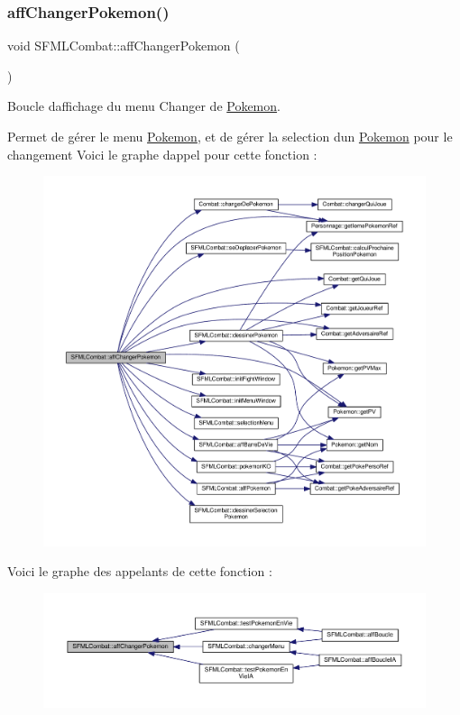 \subsubsection{\texorpdfstring{aff\+Changer\+Pokemon()}{affChangerPokemon()}}
{\footnotesize\ttfamily void S\+F\+M\+L\+Combat\+::aff\+Changer\+Pokemon (\begin{DoxyParamCaption}{ }\end{DoxyParamCaption})\hspace{0.3cm}{\ttfamily [private]}}



Boucle d\textquotesingle{}affichage du menu Changer de \hyperlink{class_pokemon}{Pokemon}. 

Permet de gérer le menu \hyperlink{class_pokemon}{Pokemon}, et de gérer la selection d\textquotesingle{}un \hyperlink{class_pokemon}{Pokemon} pour le changement Voici le graphe d\textquotesingle{}appel pour cette fonction \+:\nopagebreak
\begin{figure}[H]
\begin{center}
\leavevmode
\includegraphics[width=350pt]{class_s_f_m_l_combat_ab8d4dfb3e7e4ca9722e52c1ef5fa897d_cgraph}
\end{center}
\end{figure}
Voici le graphe des appelants de cette fonction \+:\nopagebreak
\begin{figure}[H]
\begin{center}
\leavevmode
\includegraphics[width=350pt]{class_s_f_m_l_combat_ab8d4dfb3e7e4ca9722e52c1ef5fa897d_icgraph}
\end{center}
\end{figure}
